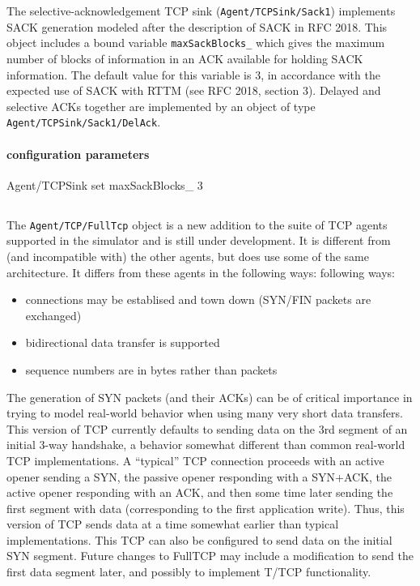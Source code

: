 \documentclass{article}
\newcommand{\shdr}[3]{\htmladdnormallink{#1}{#2}\label{#3}}
\begin{document}
The selective-acknowledgement TCP sink ({\tt Agent/TCPSink/Sack1}) implements
SACK generation modeled after the description of SACK in RFC 2018.
This object includes a bound variable {\tt maxSackBlocks\_} which gives
the maximum number of blocks of information in an ACK available for
holding SACK information.
The default value for this variable is 3, in accordance with the expected
use of SACK with RTTM (see RFC 2018, section 3).
Delayed and selective ACKs together are implemented by
an object of type {\tt Agent/TCPSink/Sack1/DelAck}.

\paragraph{configuration parameters}
\begin{program}
Agent/TCPSink set maxSackBlocks_ 3
\end{program}

\subsection{\shdr{Two-Way TCP Agents (FullTcp)}{tcp.h}{sec:fulltcp}}
\label{sec:fulltcp}

The {\tt Agent/TCP/FullTcp} object is a new addition to the suite of
TCP agents supported in the simulator and is still under development.
It is different from (and incompatible with) the other agents, but
does use some of the same architecture.
It differs from these agents in the following ways:
following ways:
\begin{itemize}
\item connections may be establised and town down
(SYN/FIN packets are exchanged)
\item bidirectional data transfer is supported
\item sequence numbers are in bytes rather than packets
\end{itemize}

The generation of SYN packets (and their ACKs) can be
of critical importance in trying to model real-world behavior
when using many very short data transfers.
This version of TCP currently defaults to sending
data on the 3rd segment of an initial 3-way handshake, a behavior
somewhat different than common real-world TCP implementations.
A ``typical'' TCP connection proceeds with an active opener
sending a SYN, the passive opener responding with a SYN+ACK,
the active opener responding with an ACK, and then some time later
sending the first segment with data (corresponding to the first
application write).
Thus, this version of TCP sends data at a time somewhat earlier
than typical implementations.
This TCP can also be configured to send data on the initial SYN
segment.
Future changes to FullTCP may include a modification to send the
first data segment later, and possibly to implement T/TCP functionality.
\end{document}
